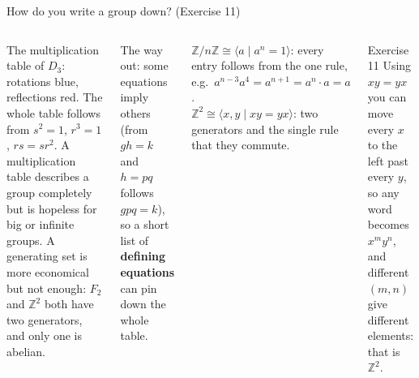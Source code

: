 \documentclass[aspectratio=169,10pt]{beamer}
\newcommand{\Z}{\mathbb{Z}}
\begin{document}
\begin{frame}{How do you write a group down? (Exercise 11)}
\begin{columns}[T]
\centering\scalebox{0.8}{\figcayleytable}\par
{\scriptsize The multiplication table of $D_3$: rotations blue, reflections red. The whole table follows from $s^2=1$, $r^3=1$, $rs=sr^2$.}
A multiplication table describes a group completely but is hopeless for big or infinite groups. A generating set is more economical but not enough: $F_2$ and $\Z^2$ both have two generators, and only one is abelian.
\vspace{3pt}

The way out: some equations imply others (from $gh=k$ and $h=pq$ follows $gpq=k$), so a short list of \textbf{defining equations} can pin down the whole table.
\begin{bigbox}
$\Z/n\Z\cong\langle a\mid a^n=1\rangle$: every entry follows from the one rule, e.g.\ $a^{n-3}a^4=a^{n+1}=a^n\cdot a=a$.\\[2pt]
$\Z^2\cong\langle x,y\mid xy=yx\rangle$: two generators and the single rule that they commute.
\end{bigbox}
\begin{exbox}{Exercise 11}
Using $xy=yx$ you can move every $x$ to the left past every $y$, so any word becomes $x^my^n$, and different $(m,n)$ give different elements: that is $\Z^2$.
\end{exbox}
\end{columns}
\end{frame}
\end{document}
